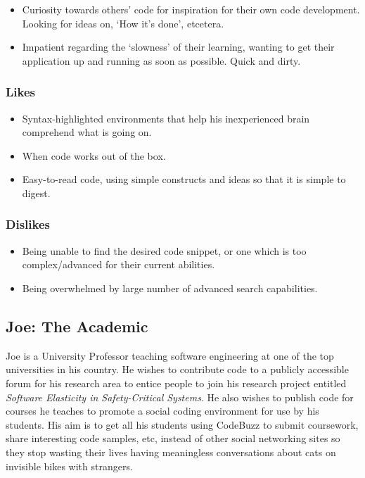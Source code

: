 \documentclass{sig-alt-release2}
\begin{document}
\begin{itemize}
\item Curiosity towards others' code for inspiration for their own code
development. Looking for ideas on, `How it's done', etcetera.
\item Impatient regarding the `slowness' of their learning, wanting to
get their application up and running as soon as possible. Quick and
dirty.
\end{itemize}

\subsubsection{Likes}

\begin{itemize}
\item Syntax-highlighted environments that help his inexperienced brain
comprehend what is going on.
\item When code works out of the box.
\item Easy-to-read code, using simple constructs and ideas so that it
is simple to digest.
\end{itemize}

\subsubsection{Dislikes}

\begin{itemize}
\item Being unable to find the desired code snippet, or one which is
too complex/advanced for their current abilities.
\item Being overwhelmed by large number of advanced search capabilities.
\end{itemize}

\subsection{Joe: The Academic}
\label{sec:joe}

Joe is a University Professor teaching software engineering at
one of the top universities in his country. He wishes to contribute
code to a publicly accessible forum for his research area to entice
people to join his research project entitled
\textit{Software Elasticity in Safety-Critical Systems}. He also wishes
to publish code for courses he teaches to promote a social coding
environment for use by his students. His aim is to get all his students
using CodeBuzz to submit coursework, share interesting code samples,
etc, instead of other social networking sites so they stop
wasting their lives having meaningless conversations about cats on
invisible bikes with strangers.
\end{document}
